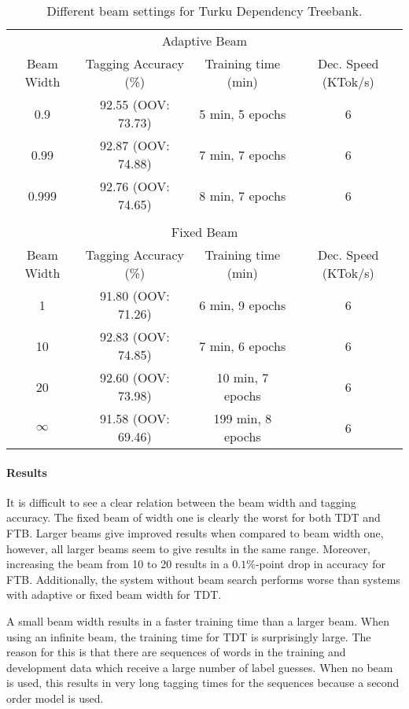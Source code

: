 \begin{table}[htb!]
\begin{center}
\begin{tabular}{cccc}
\multicolumn{4}{c}{Adaptive Beam}\\
Beam Width & Tagging Accuracy (\%) & Training time (min) & Dec. Speed (KTok/s)\\
\hline
0.9       & 92.55 (OOV: 73.73)           & 5 min, 5 epochs           & 6            \\
0.99       & 92.87 (OOV: 74.88)           & 7 min, 7 epochs            & 6            \\
0.999       & 92.76 (OOV: 74.65)            & 8 min, 7 epochs            & 6            \\
           &                  &               &               \\
\multicolumn{4}{c}{Fixed Beam}\\
Beam Width & Tagging Accuracy (\%) & Training time (min) & Dec. Speed (KTok/s) \\
\hline
1        & 91.80 (OOV: 71.26)           & 6 min, 9 epochs            & 6            \\
10       & 92.83 (OOV: 74.85)           &  7 min, 6 epochs           & 6            \\
20       & 92.60 (OOV: 73.98)           & 10 min, 7 epochs            & 6            \\
$\infty$       & 91.58  (OOV: 69.46)          & 199 min, 8 epochs            & 6            \\
\end{tabular}
\caption{Different beam settings for Turku Dependency Treebank.}
\end{center}
\end{table}


\paragraph{Results} It is difficult to see a clear relation between
the beam width and tagging accuracy. The fixed beam of width one is
clearly the worst for both TDT and FTB. Larger beams give improved
results when compared to beam width one, however, all larger beams seem
to give results in the same range. Moreover, increasing the beam from
10 to 20 results in a $0.1\%$-point drop in accuracy for
FTB. Additionally, the system without beam search performs worse
than systems with adaptive or fixed beam width for TDT.

A small beam width results in a faster training time than a larger
beam. When using an infinite beam, the training time for TDT is
surprisingly large. The reason for this is that there are sequences of
words in the training and development data which receive a large
number of label guesses. When no beam is used, this results in very
long tagging times for the sequences because a second order model is
used.

